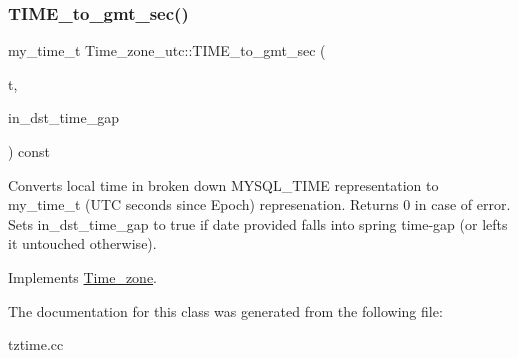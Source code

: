\subsubsection{\texorpdfstring{T\+I\+M\+E\+\_\+to\+\_\+gmt\+\_\+sec()}{TIME\_to\_gmt\_sec()}}
{\footnotesize\ttfamily my\+\_\+time\+\_\+t Time\+\_\+zone\+\_\+utc\+::\+T\+I\+M\+E\+\_\+to\+\_\+gmt\+\_\+sec (\begin{DoxyParamCaption}\item[{const M\+Y\+S\+Q\+L\+\_\+\+T\+I\+ME $\ast$}]{t,  }\item[{my\+\_\+bool $\ast$}]{in\+\_\+dst\+\_\+time\+\_\+gap }\end{DoxyParamCaption}) const\hspace{0.3cm}{\ttfamily [virtual]}}

Converts local time in broken down M\+Y\+S\+Q\+L\+\_\+\+T\+I\+ME representation to my\+\_\+time\+\_\+t (U\+TC seconds since Epoch) represenation. Returns 0 in case of error. Sets in\+\_\+dst\+\_\+time\+\_\+gap to true if date provided falls into spring time-\/gap (or lefts it untouched otherwise). 

Implements \mbox{\hyperlink{classTime__zone_a980bb1d59fe04e899b116169f1b3166d}{Time\+\_\+zone}}.



The documentation for this class was generated from the following file\+:\begin{DoxyCompactItemize}
\item 
tztime.\+cc\end{DoxyCompactItemize}
